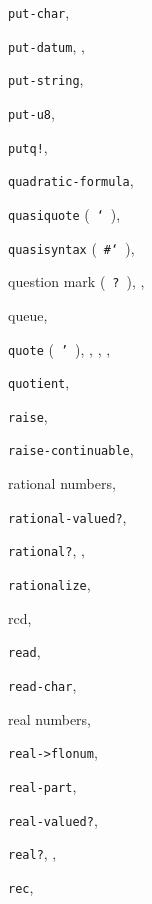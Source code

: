 {\begin{multicols}{2}
\texttt{put-char}, \textit{\pageref{io_s71}}
  
\texttt{put-datum}, \textit{\pageref{io_s73}}, \pageref{examples_s31}
  
\texttt{put-string}, \textit{\pageref{io_s72}}
  
\texttt{put-u8}, \textit{\pageref{io_s69}}
  
\texttt{putq!}, \pageref{start_s183}
  
\texttt{quadratic-formula}, \pageref{start_s166}
  
\texttt{quasiquote} ( \texttt{`} ), \textit{\pageref{objects_s5}}
  
\texttt{quasisyntax} ( \texttt{\#{}`} ), \textit{\pageref{syntax_s40}}
  
question mark ( \texttt{?} ), \pageref{intro_s47}, \pageref{start_s112}
  
queue, \pageref{start_s180}
  
\texttt{quote} ( \texttt{'} ), \pageref{start_s16}, \pageref{start_s45}, \pageref{further_s5}, \textit{\pageref{objects_s2}}
  
\texttt{quotient}, \textit{\pageref{objects_s98}}
  
\texttt{raise}, \textit{\pageref{exceptions_s3}}
  
\texttt{raise-continuable}, \textit{\pageref{exceptions_s3}}
  
rational numbers, \pageref{objects_s65}
  
\texttt{rational-valued?}, \textit{\pageref{objects_s18}}
  
\texttt{rational?}, \textit{\pageref{objects_s17}}, \pageref{objects_s69}
  
\texttt{rationalize}, \textit{\pageref{objects_s117}}
  
rcd, \pageref{records_s26}
  
\texttt{read}, \textit{\pageref{io_s81}}
  
\texttt{read-char}, \textit{\pageref{io_s82}}
  
real numbers, \pageref{objects_s66}
  
\texttt{real-\textgreater{}flonum}, \textit{\pageref{objects_s198}}
  
\texttt{real-part}, \textit{\pageref{objects_s120}}
  
\texttt{real-valued?}, \textit{\pageref{objects_s18}}
  
\texttt{real?}, \textit{\pageref{objects_s17}}, \pageref{objects_s70}
  
\texttt{rec}, \pageref{syntax_s52}
  

\end{multicols}}

